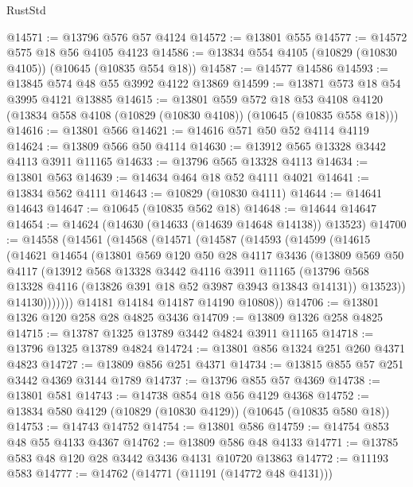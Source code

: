 \begin{lexlean}{RustStd}
\begin{coremodule}
@14571 := @13796 @576 @57 @4124
@14572 := @13801 @555
@14577 := @14572 @575 @18 @56 @4105 @4123
@14586 := @13834 @554 @4105 (@10829 (@10830 @4105)) (@10645 (@10835 @554 @18))
@14587 := @14577 @14586
@14593 := @13845 @574 @48 @55 @3992 @4122 @13869
@14599 := @13871 @573 @18 @54 @3995 @4121 @13885
@14615 := @13801
    @559
    @572
    @18
    @53
    @4108
    @4120
    (@13834 @558 @4108 (@10829 (@10830 @4108)) (@10645 (@10835 @558 @18)))
@14616 := @13801 @566
@14621 := @14616 @571 @50 @52 @4114 @4119
@14624 := @13809 @566 @50 @4114
@14630 := @13912 @565 @13328 @3442 @4113 @3911 @11165
@14633 := @13796 @565 @13328 @4113
@14634 := @13801 @563
@14639 := @14634 @464 @18 @52 @4111 @4021
@14641 := @13834 @562 @4111
@14643 := @10829 (@10830 @4111)
@14644 := @14641 @14643
@14647 := @10645 (@10835 @562 @18)
@14648 := @14644 @14647
@14654 := @14624 (@14630 (@14633 (@14639 @14648 @14138)) @13523)
@14700 := @14558
    (@14561
      (@14568
        (@14571
          (@14587
            (@14593
              (@14599
                (@14615
                  (@14621
                    @14654
                    (@13801
                      @569
                      @120
                      @50
                      @28
                      @4117
                      @3436
                      (@13809
                        @569
                        @50
                        @4117
                        (@13912
                          @568
                          @13328
                          @3442
                          @4116
                          @3911
                          @11165
                          (@13796 @568 @13328 @4116 (@13826 @391 @18 @52 @3987 @3943 @13843 @14131))
                          @13523))
                      @14130)))))))
        @14181
        @14184
        @14187
        @14190
        @10808))
@14706 := @13801 @1326 @120 @258 @28 @4825 @3436
@14709 := @13809 @1326 @258 @4825
@14715 := @13787 @1325 @13789 @3442 @4824 @3911 @11165
@14718 := @13796 @1325 @13789 @4824
@14724 := @13801 @856 @1324 @251 @260 @4371 @4823
@14727 := @13809 @856 @251 @4371
@14734 := @13815 @855 @57 @251 @3442 @4369 @3144 @1789
@14737 := @13796 @855 @57 @4369
@14738 := @13801 @581
@14743 := @14738 @854 @18 @56 @4129 @4368
@14752 := @13834 @580 @4129 (@10829 (@10830 @4129)) (@10645 (@10835 @580 @18))
@14753 := @14743 @14752
@14754 := @13801 @586
@14759 := @14754 @853 @48 @55 @4133 @4367
@14762 := @13809 @586 @48 @4133
@14771 := @13785 @583 @48 @120 @28 @3442 @3436 @4131 @10720 @13863
@14772 := @11193 @583
@14777 := @14762 (@14771 (@11191 (@14772 @48 @4131)))

\end{coremodule}
\end{lexlean}
